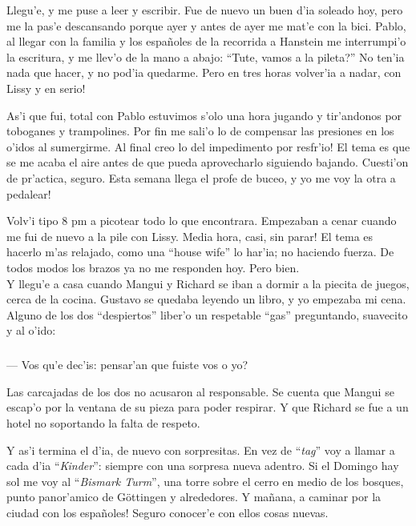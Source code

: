 Llegu'e, y me puse a leer y escribir. Fue de nuevo un buen d'ia soleado hoy,
pero me la pas'e descansando porque ayer y antes de ayer me mat'e con la bici.
Pablo, al llegar con la familia y los espa\~noles de la recorrida a
Hanstein me interrumpi'o la escritura, y me llev'o de la mano a abajo: ``Tute,
\textquestiondown vamos a la pileta?'' No ten'ia nada que hacer, y no pod'ia
quedarme. \textexclamdown Pero en tres horas volver'ia a nadar, con Lissy y en
serio!

As'i que fui, total con Pablo estuvimos s'olo una hora jugando y tir'andonos por
toboganes y trampolines. Por fin me sali'o lo de compensar las presiones en los
o'idos al sumergirme. \textexclamdown Al final creo lo del impedimento por
resfr'io! El tema es que se me acaba el aire antes de que pueda aprovecharlo
siguiendo bajando. Cuesti'on de pr'actica, seguro. \textexclamdown Esta
semana llega el profe de buceo, y yo me voy la otra a pedalear!

Volv'i tipo 8 pm a picotear todo lo que encontrara. Empezaban a cenar cuando me
fui de nuevo a la pile con Lissy. \textexclamdown Media hora, casi, sin parar!
El tema es hacerlo m'as relajado, como una ``house wife'' lo har'ia; no haciendo
fuerza. De todos modos los brazos ya no me responden hoy. Pero bien.\\

Y llegu'e a casa cuando Mangui y Richard se iban a dormir a la piecita de
juegos, cerca de la cocina. Gustavo se quedaba leyendo un libro, y yo empezaba
mi cena. Alguno de los dos ``despiertos'' liber'o un respetable ``gas''
preguntando, suavecito y al o'ido:

\subparagraph{}\label{ssub:gasRespetable}
--- Vos qu'e dec'is: \textquestiondown pensar'an que fuiste vos o yo?\\
\hangindent=1cm

Las carcajadas de los dos no acusaron al responsable. Se cuenta que Mangui se
escap'o por la ventana de su pieza para poder respirar. Y que Richard se fue a
un hotel no soportando la falta de respeto.

Y as'i termina el d'ia, de nuevo con sorpresitas. En vez de ``\emph{tag}'' voy a
llamar a cada d'ia ``\emph{Kinder}'': siempre con una sorpresa nueva adentro. Si
el Domingo hay sol me voy al ``\emph{Bismark Turm}'', una torre sobre el
cerro en medio de los bosques, punto panor'amico de G\"ottingen y alrededores. Y
ma\~nana, \textexclamdown a caminar por la ciudad con los espa\~noles! Seguro
conocer'e con ellos cosas nuevas.

